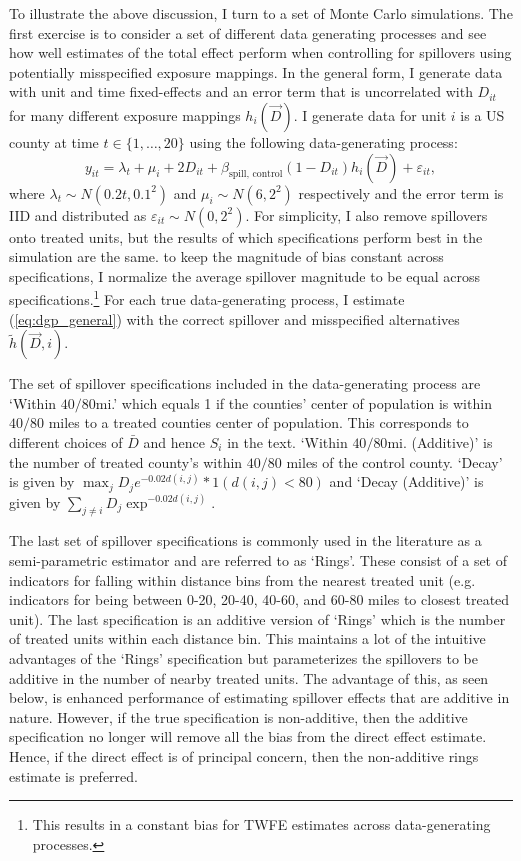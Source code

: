 \documentclass[11pt]{article}
\begin{document}
To illustrate the above discussion, I turn to a set of Monte Carlo simulations. The first exercise is to consider a set of different data generating processes and see how well estimates of the total effect perform when controlling for spillovers using potentially misspecified exposure mappings. In the general form, I generate data with unit and time fixed-effects and an error term that is uncorrelated with $D_{it}$ for many different exposure mappings $h_i(\vec{D})$. I generate data for unit $i$ is a US county at time $t \in \{1, \dots, 20\}$ using the following data-generating process:
\begin{equation}\label{eq:dgp_general}
    y_{it} = \lambda_t + \mu_i + 2 D_{it} + \beta_{\text{spill, control}} (1-D_{it}) h_i(\vec{D}) + \varepsilon_{it},
\end{equation}
where $\lambda_t \sim N(0.2t, 0.1^2)$ and $\mu_i \sim N(6, 2^2)$ respectively and the error term is IID and distributed as $\varepsilon_{it} \sim N(0, 2^2)$. For simplicity, I also remove spillovers onto treated units, but the results of which specifications perform best in the simulation are the same. to keep the magnitude of bias constant across specifications, I normalize the average spillover magnitude to be equal across specifications.\footnote{This results in a constant bias for TWFE estimates across data-generating processes.} For each true data-generating process, I estimate (\ref{eq:dgp_general}) with the correct spillover and misspecified alternatives $\tilde{h}(\vec{D}, i)$. 

The set of spillover specifications included in the data-generating process are `Within $40/80$mi.' which equals 1 if the counties' center of population is within $40/80$ miles to a treated counties center of population. This corresponds to different choices of $\bar{D}$ and hence $S_i$ in the text. `Within $40/80$mi. (Additive)' is the number of treated county's within $40/80$ miles of the control county. `Decay' is given by $\max_j D_j e^{-0.02 d(i,j)} * 1(d(i,j) < 80)$ and `Decay (Additive)' is given by $\sum_{j \neq i} D_j \exp^{-0.02 d(i,j)}$.

The last set of spillover specifications is commonly used in the literature as a semi-parametric estimator and are referred to as `Rings'. These consist of a set of indicators for falling within distance bins from the nearest treated unit (e.g. indicators for being between 0-20, 20-40, 40-60, and 60-80 miles to closest treated unit). The last specification is an additive version of `Rings' which is the number of treated units within each distance bin. This maintains a lot of the intuitive advantages of the `Rings' specification but parameterizes the spillovers to be additive in the number of nearby treated units. The advantage of this, as seen below, is enhanced performance of estimating spillover effects that are additive in nature. However, if the true specification is non-additive, then the additive specification no longer will remove all the bias from the direct effect estimate. Hence, if the direct effect is of principal concern, then the non-additive rings estimate is preferred.
\end{document}

